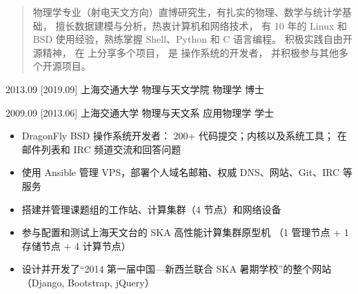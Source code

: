 \documentclass[zh]{resume}
\begin{document}
\makeheader

\begin{abstract}
物理学专业（射电天文方向）直博研究生，有扎实的物理、数学与统计学基础，
擅长数据建模与分析，热衷计算机和网络技术，
有 10 年的 Linux 和 BSD 使用经验，熟练掌握 Shell、Python 和 C 语言编程。
积极实践自由开源精神，
在  上分享多个项目，
是  操作系统的开发者，
并积极参与其他多个开源项目。
\end{abstract}

\begin{competences}
\end{competences}

\begin{educations}
  \education%
    {2013.09}%
    [2019.09]%
    {上海交通大学}%
    {物理与天文学院}%
    {物理学}%
    {博士}

  \separator{0.5ex}
  \education%
    {2009.09}%
    [2013.06]%
    {上海交通大学}%
    {物理与天文系}%
    {应用物理学}%
    {学士}
\end{educations}

\begin{itemize}
  \item DragonFly BSD 操作系统开发者：
    200+ 代码提交；内核以及系统工具；
    在邮件列表和 IRC 频道交流和回答问题
  \item 使用 Ansible 管理 VPS，部署个人域名邮箱、权威 DNS、网站、Git、IRC 等服务
  \item 搭建并管理课题组的工作站、计算集群（4 节点）和网络设备
  \item 参与配置和测试上海天文台的 SKA 高性能计算集群原型机
    （1 管理节点 + 1 存储节点 + 4 计算节点）
  \item 设计并开发了\enquote{2014 第一届中国—新西兰联合 SKA 暑期学校}的整个网站
    （Django, Bootstrap, jQuery）
\end{itemize}
\end{document}
